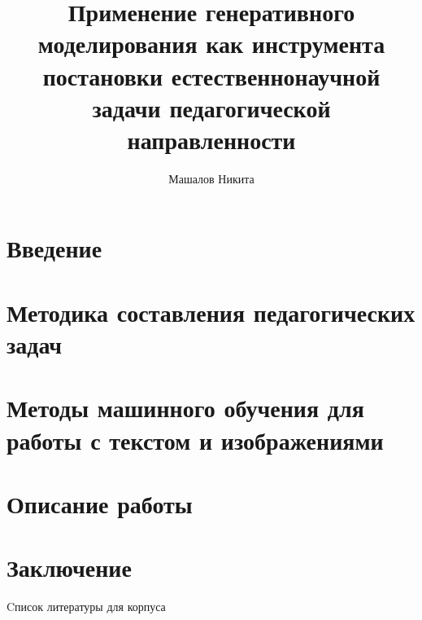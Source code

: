 \documentclass{mipt-thesis-bs}
\title{Применение генеративного моделирования как инструмента постановки естественнонаучной задачи педагогической направленности}
\author{Машалов Никита}
\begin{document}
\chapter{Введение}

\chapter{Методика составления педагогических задач}

\chapter{Методы машинного обучения для работы с текстом и изображениями}

\chapter{Описание работы}

\chapter{Заключение}



\printbib

\begin{appendices}
Cписок литературы для корпуса

\end{appendices}
\end{document}
